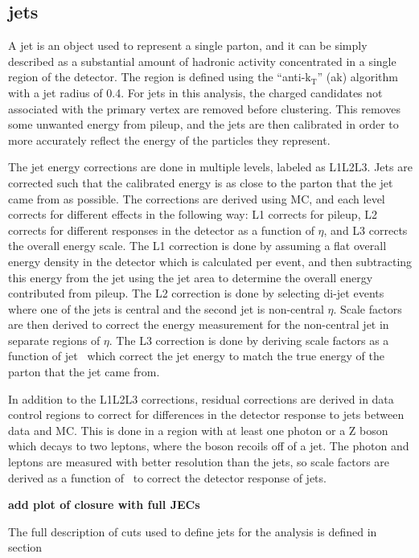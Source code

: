 \subsection{jets}
\label{ssec:jets}
A jet is an object used to represent a single parton, and it can be simply described as a substantial amount of hadronic activity concentrated in a single region of the detector.
The region is defined using the ``anti-$\mathrm{k_{T}}$'' (ak) algorithm~\cite{antikt} with a jet radius of 0.4.
For jets in this analysis, the charged candidates not associated with the primary vertex are removed before clustering. 
This removes some unwanted energy from pileup, and the jets are then calibrated in order to more accurately reflect the energy of the particles they represent.

The jet energy corrections are done in multiple levels, labeled as L1L2L3.
Jets are corrected such that the calibrated energy is as close to the parton that the jet came from as possible.
The corrections are derived using MC, and each level corrects for different effects in the following way:
L1 corrects for pileup,
L2 corrects for different responses in the detector as a function of $\eta$,
and L3 corrects the overall energy scale.
The L1 correction is done by assuming a flat overall energy density in the detector which is calculated per event,
and then subtracting this energy from the jet using the jet area to determine the overall energy contributed from pileup.
The L2 correction is done by selecting di-jet events where one of the jets is central and the second jet is non-central $\eta$.
Scale factors are then derived to correct the energy measurement for the non-central jet in separate regions of $\eta$.
The L3 correction is done by deriving scale factors as a function of jet \pt\ which correct the jet energy to match the true energy of the parton that the jet came from.

In addition to the L1L2L3 corrections, residual corrections are derived in data control regions to correct for differences in the detector response to jets between data and MC.
This is done in a region with at least one photon or a Z boson which decays to two leptons, where the boson recoils off of a jet.
The photon and leptons are measured with better resolution than the jets, so scale factors are derived as a function of \pt\ to correct the detector response of jets.

{\bf add plot of closure with full JECs}

The full description of cuts used to define jets for the analysis is defined in section 
